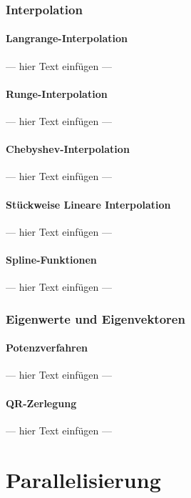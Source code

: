 \documentclass[a4paper, 12pt]{article}
\begin{document}
\section{Interpolation}


\subsection{Langrange-Interpolation}
--- hier Text einfügen ---


\subsection{Runge-Interpolation}
--- hier Text einfügen ---


\subsection{Chebyshev-Interpolation}
--- hier Text einfügen ---


\subsection{Stückweise Lineare Interpolation}
--- hier Text einfügen ---


\subsection{Spline-Funktionen}
--- hier Text einfügen ---



\section{Eigenwerte und Eigenvektoren}


\subsection{Potenzverfahren}
--- hier Text einfügen ---


\subsection{QR-Zerlegung}
--- hier Text einfügen ---




\part{Parallelisierung}
\end{document}
